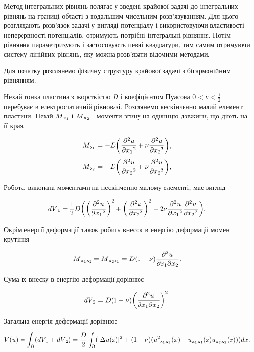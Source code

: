 \documentclass[12pt]{report}
\begin{document}
Метод інтегральних рівнянь полягає у зведені крайової задачі до інтегральних рівнянь на границі області з подальшим чисельним розв'язуванням. Для цього розглядають розв'язок задачі у вигляді потенціалу і використовуючи властивості неперервності потенціалів, отримують потрібні інтегральні рівняння. Потім рівняння параметризують і застосовують певні квадратури, тим самим отримуючи систему лінійних рівнянь, яку можна розв'язати відомими методами. 

Для початку розглянемо фізичну структуру крайової задачі з бігармонійним рівнянням.

Нехай тонка пластина з жорсткістю $D$ і коефіцієнтом Пуасона $0<\nu<\frac{1}{2}$ перебуває в електростатичній рівновазі. Розглянемо нескінченно малий елемент пластини. Нехай $M\textsubscript{x\textsubscript{1}}$ і $M\textsubscript{x\textsubscript{2}}$ - моменти згину на одиницю довжини, що діють на її края. 

$$
	M\textsubscript{x\textsubscript{1}}=-D\bigg(\frac{\partial^{2} u}{\partial x\textsubscript{1}^2}+\nu\frac{\partial^{2} u}{\partial x\textsubscript{2}^2}\bigg),
$$
$$
	M\textsubscript{x\textsubscript{2}}=-D\bigg(\frac{\partial^{2} u}{\partial x\textsubscript{2}^2}+\nu\frac{\partial^{2} u}{\partial x\textsubscript{2}^2}\bigg),
$$

Робота, виконана моментами на нескінченно малому елементі, має вигляд

$$
	dV\textsubscript{1}=\frac{1}{2}D\bigg(\bigg(\frac{\partial^{2} u}{\partial x\textsubscript{1}^2}\bigg)^2+\bigg(\frac{\partial^{2} u}{\partial x\textsubscript{2}^2}\bigg)^2+2\nu\frac{\partial^{2} u}{\partial x\textsubscript{1}^2}\frac{\partial^{2} u}{\partial x\textsubscript{2}^2}\bigg).
$$

Окрім енергії деформації також робить внесок в енергію деформації момент крутіння

$$
	M\textsubscript{x\textsubscript{1}x\textsubscript{2}}=M\textsubscript{x\textsubscript{2}x\textsubscript{1}}=D(1-\nu)\frac{\partial^{2} u}{\partial x\textsubscript{1}\partial x\textsubscript{2}}.
$$

Сума їх внеску в енергію деформації дорівнює

$$
	dV\textsubscript{2}=D(1-\nu)\bigg(\frac{\partial^{2} u}{\partial x\textsubscript{1}\partial x\textsubscript{2}}\bigg)^2.
$$

Загальна енергія деформації дорівнює

 $$
 	V( u)=\int_{\Omega}(dV\textsubscript{1}+dV\textsubscript{2})=\frac{D}{2}\int_{\Omega}(|\Delta u(x)|^2+(1-\nu)( u^2\textsubscript{x\textsubscript{1}}\textsubscript{x\textsubscript{2}}(x)- u\textsubscript{x\textsubscript{1}}\textsubscript{x\textsubscript{1}}(x) u\textsubscript{x\textsubscript{2}}\textsubscript{x\textsubscript{2}}(x)))dx.
$$
 
\end{document}
